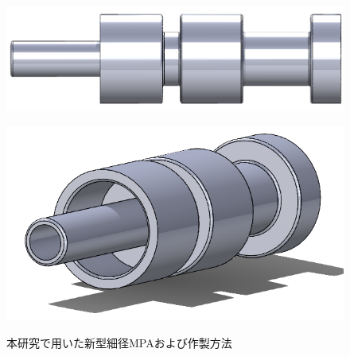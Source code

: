 \begin{figure}[htbp]
  \begin{minipage}{0.49\hsize}
    \vspace{5mm}
    \centering  
    \includegraphics[scale=0.3]{image/tanbubuhin.png}
    \vspace{7mm}
    \label{fig:MPA_tanbu_2_3}
  \end{minipage}
  \begin{minipage}{0.49\hsize}
    \vspace{5mm}
    \centering  
    \includegraphics[scale=0.3]{image/MPA_cap.png}
    \label{fig:MPA_tanbu_2_4}
  \end{minipage}
  \caption{本研究で用いた新型細径MPAおよび作製方法}
  \label{fig:MPA_tanbu_2}
\end{figure}
\clearpage
